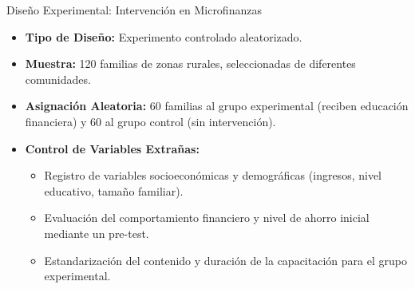 ﻿\documentclass{beamer}
\begin{document}
\begin{frame}{Diseño Experimental: Intervención en Microfinanzas}
  \begin{itemize}
      \item \textbf{Tipo de Diseño:} Experimento controlado aleatorizado.
      \item \textbf{Muestra:} 120 familias de zonas rurales, seleccionadas de diferentes comunidades.
      \item \textbf{Asignación Aleatoria:} 60 familias al grupo experimental (reciben educación financiera) y 60 al grupo control (sin intervención).
      \item \textbf{Control de Variables Extrañas:}
      \begin{itemize}
          \item Registro de variables socioeconómicas y demográficas (ingresos, nivel educativo, tamaño familiar).
          \item Evaluación del comportamiento financiero y nivel de ahorro inicial mediante un pre-test.
          \item Estandarización del contenido y duración de la capacitación para el grupo experimental.
      \end{itemize}
  \end{itemize}
\end{frame}
\end{document}
